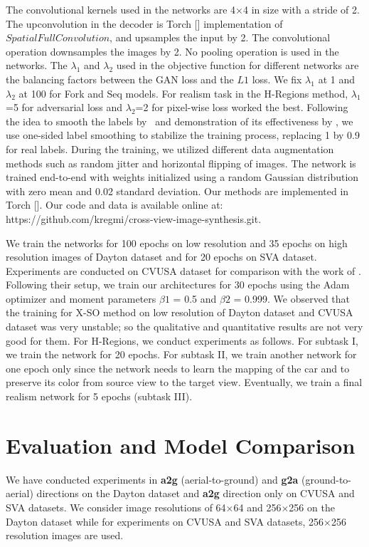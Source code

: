 \documentclass[times,twocolumn,final,authoryear]{elsarticle_modified}
\begin{document}
The convolutional kernels used in the networks are 4$\times$4 in size with a stride of 2. The upconvolution in the decoder is Torch [\cite{torch}] implementation of $SpatialFullConvolution$, and upsamples the input by 2. The convolutional operation downsamples the images by 2. No pooling operation is used in the networks. The $\lambda_1$ and $\lambda_2$ used in the objective function for different networks are the balancing factors between the GAN loss and the $L1$ loss. We fix $\lambda_1$ at 1 and $\lambda_2$ at 100 for Fork and Seq models. For realism task in the H-Regions method, $\lambda_1$=5 for adversarial loss and $\lambda_2$=2 for pixel-wise loss worked the best. Following the idea to smooth the labels by~\cite{DBLP:conf/cvpr/SzegedyVISW16} and demonstration of its effectiveness by \cite{DBLP:conf/nips/SalimansGZCRCC16}, we use one-sided label smoothing to stabilize the training process, replacing 1 by 0.9 for real labels. During the training, we utilized different data augmentation methods such as random jitter and horizontal flipping of images. The network is trained end-to-end with weights initialized using a random Gaussian distribution with zero mean and 0.02 standard deviation. Our methods are implemented in Torch [\cite{torch}]. Our code and data is available online at: 
https://github.com/kregmi/cross-view-image-synthesis.git. 



We train the networks for 100 epochs on low resolution and 35 epochs on high resolution images of Dayton dataset and for 20 epochs on SVA dataset. Experiments are conducted on CVUSA dataset for comparison with the work of \cite{zhai2017crossview}. Following their setup, we train our architectures for 30 epochs using the Adam optimizer and moment parameters $\beta 1$ = 0.5 and $\beta 2$ = 0.999. We observed that the training for X-SO method on low resolution of Dayton dataset and CVUSA dataset was very unstable; so the qualitative and quantitative results are not very good for them. For H-Regions, we conduct experiments as follows. For subtask I, we train the network for 20 epochs. For subtask II, we train another network for one epoch only since the network needs to learn the mapping of the car and to preserve its color from source view to the target view. Eventually, we train a final realism network for 5 epochs (subtask III).

 \vspace{-5pt}
\section{Evaluation and Model Comparison}
\label{sec:results}
We have conducted experiments in \textbf{a2g} (aerial-to-ground) and \textbf{g2a} (ground-to-aerial) directions on the Dayton dataset and \textbf{a2g} direction only on CVUSA and SVA datasets. 
We consider image resolutions of 64$\times$64 and 256$\times$256 on the Dayton dataset while for experiments on CVUSA and SVA datasets, 256$\times$256 resolution images are used. 
\end{document}
